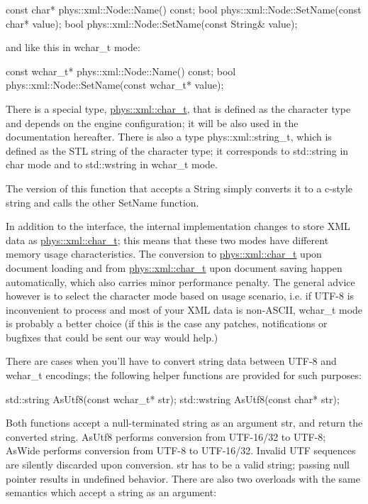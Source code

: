\begin{DoxyCode}
 const char* phys::xml::Node::Name() const;
 bool phys::xml::Node::SetName(const char* value);
 bool phys::xml::Node::SetName(const String& value);
\end{DoxyCode}
 and like this in wchar\_\-t mode: 
\begin{DoxyCode}
 const wchar_t* phys::xml::Node::Name() const;
 bool phys::xml::Node::SetName(const wchar_t* value);
\end{DoxyCode}
 There is a special type, \hyperlink{namespacephys_1_1xml_afc87705cd1c2917d87b879715a2d8f6e}{phys::xml::char\_\-t}, that is defined as the character type and depends on the engine configuration; it will be also used in the documentation hereafter. There is also a type phys::xml::string\_\-t, which is defined as the STL string of the character type; it corresponds to std::string in char mode and to std::wstring in wchar\_\-t mode. \par
 \par
 The version of this function that accepts a String simply converts it to a c-\/style string and calls the other SetName function. \par
 \par
 In addition to the interface, the internal implementation changes to store XML data as \hyperlink{namespacephys_1_1xml_afc87705cd1c2917d87b879715a2d8f6e}{phys::xml::char\_\-t}; this means that these two modes have different memory usage characteristics. The conversion to \hyperlink{namespacephys_1_1xml_afc87705cd1c2917d87b879715a2d8f6e}{phys::xml::char\_\-t} upon document loading and from \hyperlink{namespacephys_1_1xml_afc87705cd1c2917d87b879715a2d8f6e}{phys::xml::char\_\-t} upon document saving happen automatically, which also carries minor performance penalty. The general advice however is to select the character mode based on usage scenario, i.e. if UTF-\/8 is inconvenient to process and most of your XML data is non-\/ASCII, wchar\_\-t mode is probably a better choice (if this is the case any patches, notifications or bugfixes that could be sent our way would help.) \par
 \par
 There are cases when you'll have to convert string data between UTF-\/8 and wchar\_\-t encodings; the following helper functions are provided for such purposes: 
\begin{DoxyCode}
 std::string AsUtf8(const wchar_t* str);
 std::wstring AsUtf8(const char* str);
\end{DoxyCode}
 Both functions accept a null-\/terminated string as an argument str, and return the converted string. AsUtf8 performs conversion from UTF-\/16/32 to UTF-\/8; AsWide performs conversion from UTF-\/8 to UTF-\/16/32. Invalid UTF sequences are silently discarded upon conversion. str has to be a valid string; passing null pointer results in undefined behavior. There are also two overloads with the same semantics which accept a string as an argument: 
